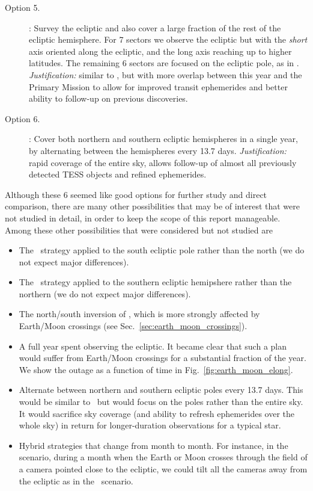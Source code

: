 \begin{description}
\item[Option 5.] \eshort: Survey the ecliptic and also cover a large
  fraction of the rest of the ecliptic hemisphere. For 7 sectors we
  observe the ecliptic but with the {\it short} axis oriented along
  the ecliptic, and the long axis reaching up to higher latitudes.
  The remaining 6 sectors are focused on the ecliptic pole, as in
  \elong.  \textit{Justification:} similar to \elong, but with more
  overlap between this year and the Primary Mission to allow for
  improved transit ephemerides and better ability to follow-up on
  previous discoveries.
  
\item[Option 6.] \hemis: Cover both northern and southern ecliptic
  hemispheres in a single year, by alternating between the hemispheres
  every 13.7 days.  \textit{Justification:} rapid coverage of the
  entire sky, allows follow-up of almost all previously detected TESS
  objects and refined ephemerides.

\end{description}

Although these 6 seemed like good options for further study and direct
comparison, there are many other possibilities that may be of interest
that were not studied in detail, in order to keep the scope of this
report manageable.  Among these other possibilities that were considered but not studied are
\begin{itemize}
	\item The \npole\, strategy applied to the south ecliptic pole rather than the north (we do not expect major differences).
	\item The \nhemi\, strategy applied to the southern ecliptic hemipshere rather than the northern (we do not expect major differences).
	\item The north/south inversion of \shemiAvoid, which is more strongly affected by Earth/Moon crossings (see Sec.~\ref{sec:earth_moon_crossings}).
	\item A full year spent observing the ecliptic.  It became clear that such a plan would suffer from Earth/Moon crossings for a substantial fraction of the year.
	We show the outage as a function of time in Fig.~\ref{fig:earth_moon_elong}.
        \item Alternate between northern and southern ecliptic poles every 13.7 days.
        This would be similar to \hemis\, but would focus on the poles rather than the entire sky.
        It would sacrifice sky coverage (and ability to refresh ephemerides over the whole sky) in return for longer-duration observations for a typical star.
        \item Hybrid strategies that change from month to month.  For instance, in the \nhemi\, scenario, during a month when the Earth or Moon crosses through the field of a camera pointed close to the ecliptic, we could tilt all the cameras away from the ecliptic as in the \npole\, scenario.        
\end{itemize}
